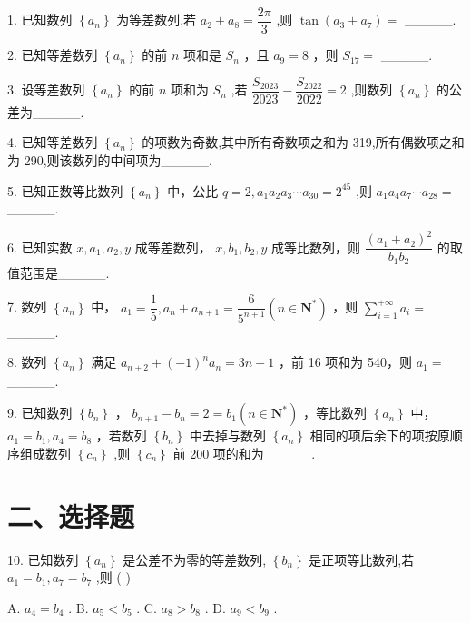 1. 已知数列 $\left\{  {a}_{n}\right\}$ 为等差数列,若 ${a}_{2} + {a}_{8} = \dfrac{2\pi }{3}$ ,则 $\tan \left( {{a}_{3} + {a}_{7}}\right)  =$ \_\_\_\_\_.

2. 已知等差数列 $\left\{  {a}_{n}\right\}$ 的前 $n$ 项和是 ${S}_{n}$ ，且 ${a}_{9} = 8$ ，则 ${S}_{17} =$ \_\_\_\_\_.

3. 设等差数列 $\left\{  {a}_{n}\right\}$ 的前 $n$ 项和为 ${S}_{n}$ ,若 $\dfrac{{S}_{2023}}{2023} - \dfrac{{S}_{2022}}{2022} = 2$ ,则数列 $\left\{  {a}_{n}\right\}$ 的公差为\_\_\_\_\_.

4. 已知等差数列 $\left\{  {a}_{n}\right\}$ 的项数为奇数,其中所有奇数项之和为 319,所有偶数项之和为 290,则该数列的中间项为\_\_\_\_\_.

5. 已知正数等比数列 $\left\{  {a}_{n}\right\}$ 中，公比 $q = 2,{a}_{1}{a}_{2}{a}_{3}\cdots {a}_{30} = {2}^{45}$ ,则 ${a}_{1}{a}_{4}{a}_{7}\cdots {a}_{28} =$ \_\_\_\_\_.

6. 已知实数 $x,{a}_{1},{a}_{2},y$ 成等差数列， $x,{b}_{1},{b}_{2},y$ 成等比数列，则 $\dfrac{{\left( {a}_{1} + {a}_{2}\right) }^{2}}{{b}_{1}{b}_{2}}$ 的取值范围是\_\_\_\_\_.

7. 数列 $\left\{  {a}_{n}\right\}$ 中， ${a}_{1} = \dfrac{1}{5},{a}_{n} + {a}_{n + 1} = \dfrac{6}{{5}^{n + 1}}\left( {n \in  {\mathbf{N}}^{ * }}\right)$ ，则 $\mathop{\sum }\limits_{{i = 1}}^{{+\infty }}{a}_{i} =$ \_\_\_\_\_.

8. 数列 $\left\{  {a}_{n}\right\}$ 满足 ${a}_{n + 2} + {\left( -1\right) }^{n}{a}_{n} = {3n} - 1$ ，前 16 项和为 540，则 ${a}_{1} =$ \_\_\_\_\_.

9. 已知数列 $\left\{  {b}_{n}\right\}$ ， ${b}_{n + 1} - {b}_{n} = 2 = {b}_{1}\left( {n \in  {\mathbf{N}}^{ * }}\right)$ ，等比数列 $\left\{  {a}_{n}\right\}$ 中， ${a}_{1} = {b}_{1},{a}_{4} = {b}_{8}$ ，若数列 $\left\{  {b}_{n}\right\}$ 中去掉与数列 $\left\{  {a}_{n}\right\}$ 相同的项后余下的项按原顺序组成数列 $\left\{  {c}_{n}\right\}$ ,则 $\left\{  {c}_{n}\right\}$ 前 200 项的和为\_\_\_\_\_.

\section*{二、选择题}

10. 已知数列 $\left\{  {a}_{n}\right\}$ 是公差不为零的等差数列, $\left\{  {b}_{n}\right\}$ 是正项等比数列,若 ${a}_{1} = {b}_{1},{a}_{7} = {b}_{7}$ ,则 ( )

A. ${a}_{4} = {b}_{4}$ . B. ${a}_{5} < {b}_{5}$ . C. ${a}_{8} > {b}_{8}$ . D. ${a}_{9} < {b}_{9}$ .

